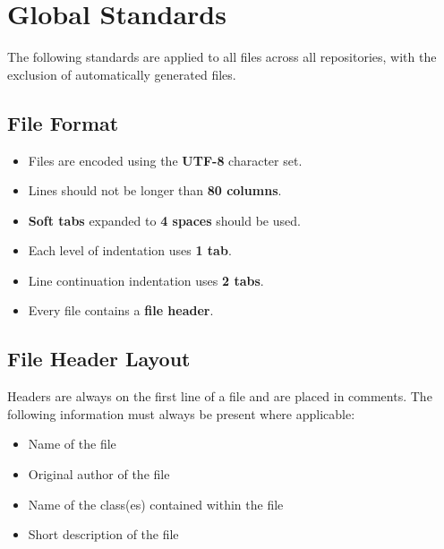 \documentclass{article}
\begin{document}
    \newpage


    \section{Global Standards}
    \label{sec:global}

    The following standards are applied to all files across all repositories,
    with the exclusion of automatically generated files.

    \subsection{File Format}
    \label{sec:file-format}

    \begin{itemize}
        \item Files are encoded using the \textbf{UTF-8} character set.
        \item Lines should not be longer than \textbf{80 columns}.
        \item \textbf{Soft tabs} expanded to \textbf{4 spaces} should be used.
        \item Each level of indentation uses \textbf{1 tab}.
        \item Line continuation indentation uses \textbf{2 tabs}.
        \item Every file contains a \textbf{file header}.
    \end{itemize}

    \subsection{File Header Layout}
    \label{sec:file-headers}

    Headers are always on the first line of a file and are placed in comments.
    The following information must always be present where applicable:

    \begin{itemize}
        \item Name of the file
        \item Original author of the file
        \item Name of the class(es) contained within the file
        \item Short description of the file
    \end{itemize}
\end{document}
